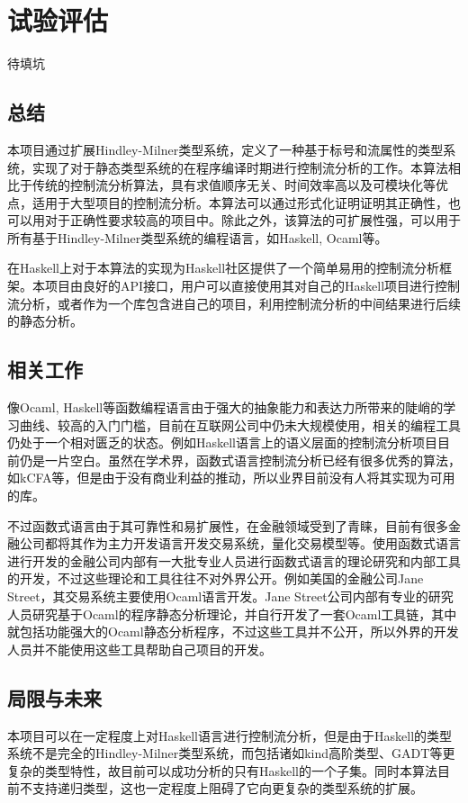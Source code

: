 \documentclass[UTF8, colorlinks]{pkuthss}
\begin{document}
	\chapter{试验评估}
	待填坑
	
	\section{总结}
	本项目通过扩展Hindley-Milner类型系统，定义了一种基于标号和流属性的类型系统，实现了对于静态类型系统的在程序编译时期进行控制流分析的工作。本算法相比于传统的控制流分析算法，具有求值顺序无关、时间效率高以及可模块化等优点，适用于大型项目的控制流分析。本算法可以通过形式化证明证明其正确性，也可以用对于正确性要求较高的项目中。除此之外，该算法的可扩展性强，可以用于所有基于Hindley-Milner类型系统的编程语言，如Haskell, Ocaml等。
	
	在Haskell上对于本算法的实现为Haskell社区提供了一个简单易用的控制流分析框架。本项目由良好的API接口，用户可以直接使用其对自己的Haskell项目进行控制流分析，或者作为一个库包含进自己的项目，利用控制流分析的中间结果进行后续的静态分析。
	\section{相关工作}
	像Ocaml, Haskell等函数编程语言由于强大的抽象能力和表达力所带来的陡峭的学习曲线、较高的入门门槛，目前在互联网公司中仍未大规模使用，相关的编程工具仍处于一个相对匮乏的状态。例如Haskell语言上的语义层面的控制流分析项目目前仍是一片空白。虽然在学术界，函数式语言控制流分析已经有很多优秀的算法，如kCFA等，但是由于没有商业利益的推动，所以业界目前没有人将其实现为可用的库。
	
	不过函数式语言由于其可靠性和易扩展性，在金融领域受到了青睐，目前有很多金融公司都将其作为主力开发语言开发交易系统，量化交易模型等。使用函数式语言进行开发的金融公司内部有一大批专业人员进行函数式语言的理论研究和内部工具的开发，不过这些理论和工具往往不对外界公开。例如美国的金融公司Jane Street，其交易系统主要使用Ocaml语言开发。Jane Street公司内部有专业的研究人员研究基于Ocaml的程序静态分析理论，并自行开发了一套Ocaml工具链，其中就包括功能强大的Ocaml静态分析程序，不过这些工具并不公开，所以外界的开发人员并不能使用这些工具帮助自己项目的开发。
	\section{局限与未来}
	本项目可以在一定程度上对Haskell语言进行控制流分析，但是由于Haskell的类型系统不是完全的Hindley-Milner类型系统，而包括诸如kind高阶类型、GADT等更复杂的类型特性，故目前可以成功分析的只有Haskell的一个子集。同时本算法目前不支持递归类型，这也一定程度上阻碍了它向更复杂的类型系统的扩展。
	
\end{document}

